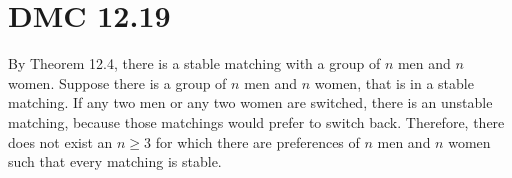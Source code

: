 \documentclass[]{article}
\def\math#1{$#1$}
\begin{document}
\section{DMC 12.19}
By Theorem 12.4, there is a stable matching with a group of \math{n} men and \math{n} women. Suppose there is a group of \math{n} 
men and \math{n} women, that is in a stable matching. If any two men or any two women are switched, there is an unstable matching, 
because those matchings would prefer to switch back. 
Therefore, there does not exist an \math{n\geq 3} for which there are preferences of \math{n} men and \math{n} women such 
that every matching is stable.
\end{document}
